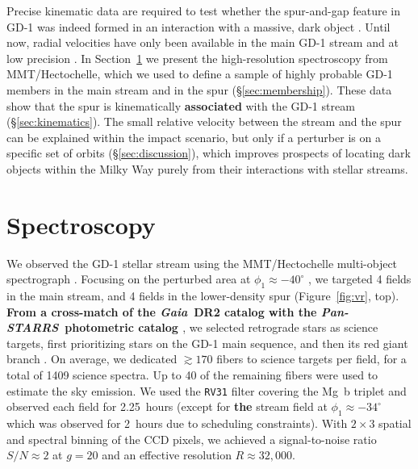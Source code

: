 \documentclass[twocolumn]{aastex63}
\newcommand{\gaia}{\textsl{Gaia}}
\newcommand{\pans}{\textsl{Pan-STARRS}}
\newcommand{\changes}[1]{{\textbf{#1}}}
\begin{document}
Precise kinematic data are required to test whether the spur-and-gap feature in GD-1 was indeed formed in an interaction with a massive, dark object \citep{bonaca2019a}.
Until now, radial velocities have only been available in the main GD-1 stream and at low precision \citep{koposov2010,huang2019}.
In Section~\ref{sec:spec} we present the high-resolution spectroscopy from MMT/Hectochelle, which we used to define a sample of highly probable GD-1 members in the main stream and in the spur (\S\ref{sec:membership}).
These data show that the spur is kinematically \changes{associated} with the GD-1 stream (\S\ref{sec:kinematics}).
The small relative velocity between the stream and the spur can be explained within the impact scenario, but only if a perturber is on a specific set of orbits (\S\ref{sec:discussion}), which improves prospects of locating dark objects within the Milky Way purely from their interactions with stellar streams.


\section{Spectroscopy}
\label{sec:spec}

We observed the GD-1 stellar stream using the MMT/Hectochelle multi-object spectrograph \citep{szentgyorgyi2011}.
Focusing on the perturbed area at $\phi_1\approx-40^\circ$ \citep[$\phi_{1,2}$ are coordinates oriented along and perpendicular to GD-1, respectively;][]{koposov2010}, we targeted 4 fields in the main stream, and 4 fields in the lower-density spur (Figure~\ref{fig:vr}, top).
\changes{From a cross-match of the \gaia\ DR2 catalog \citep{gdr2} with the \pans\ photometric catalog \citep{ps1}}, we selected retrograde stars as science targets, first prioritizing stars on the GD-1 main sequence, and then its red giant branch \citep[see][]{pwb}.
On average, we dedicated $\gtrsim170$ fibers to science targets per field, for a total of 1409 science spectra.
Up to 40 of the remaining fibers were used to estimate the sky emission.
We used the \texttt{RV31} filter covering the Mg~b triplet and observed each field for 2.25~hours (except for \changes{the} stream field at $\phi_1\approx-34^\circ$ which was observed for 2~hours due to scheduling constraints).
With $2\times3$ spatial and spectral binning of the CCD pixels, we achieved a signal-to-noise ratio $S/N\approx2$ at $g=20$ and an effective resolution $R\approx32,000$.
\end{document}
